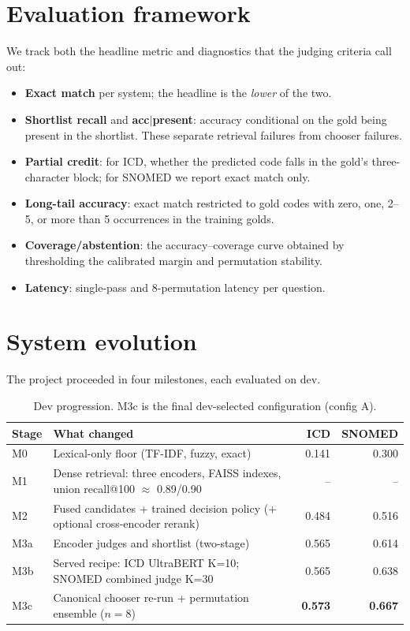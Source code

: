 \documentclass[11pt]{article}
\begin{document}
\section{Evaluation framework}
We track both the headline metric and diagnostics that the judging criteria call out:
\begin{itemize}[leftmargin=1.2em]
  \item \textbf{Exact match} per system; the headline is the \emph{lower} of the two.
  \item \textbf{Shortlist recall} and \textbf{acc$|$present}: accuracy conditional on the gold
  being present in the shortlist. These separate retrieval failures from chooser failures.
  \item \textbf{Partial credit}: for ICD, whether the predicted code falls in the gold's
  three-character block; for SNOMED we report exact match only.
  \item \textbf{Long-tail accuracy}: exact match restricted to gold codes with zero, one,
  2--5, or more than 5 occurrences in the training golds.
  \item \textbf{Coverage/abstention}: the accuracy--coverage curve obtained by thresholding
  the calibrated margin and permutation stability.
  \item \textbf{Latency}: single-pass and 8-permutation latency per question.
\end{itemize}

\section{System evolution}
The project proceeded in four milestones, each evaluated on dev.

\begin{table}[H]
\centering
\small
\begin{tabularx}{\linewidth}{@{}lXrr@{}}
\toprule
Stage & What changed & ICD & SNOMED\\
\midrule
M0 & Lexical-only floor (TF-IDF, fuzzy, exact) & 0.141 & 0.300\\
M1 & Dense retrieval: three encoders, FAISS indexes, union recall@100 $\approx$ 0.89/0.90 & -- & --\\
M2 & Fused candidates + trained decision policy (+ optional cross-encoder rerank) & 0.484 & 0.516\\
M3a & Encoder judges and shortlist (two-stage) & 0.565 & 0.614\\
M3b & Served recipe: ICD UltraBERT K=10; SNOMED combined judge K=30 & 0.565 & 0.638\\
M3c & Canonical chooser re-run + permutation ensemble ($n{=}8$) & \textbf{0.573} & \textbf{0.667}\\
\bottomrule
\end{tabularx}
\caption{Dev progression. M3c is the final dev-selected configuration (config A).}
\end{table}
\end{document}
